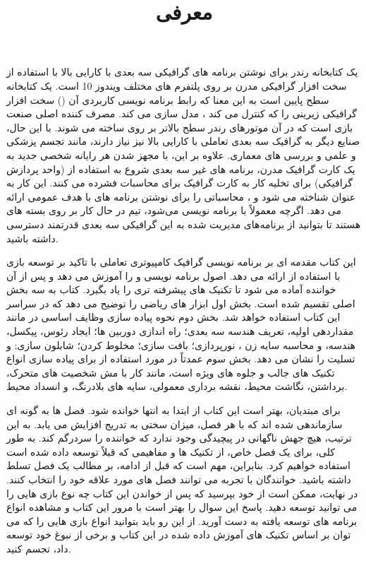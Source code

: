 \title{
    \center \Huge
    \textbf{معرفی}
    \\[25pt]
}

{\large
{} یک کتابخانه رندر برای نوشتن برنامه های گرافیکی سه بعدی با کارایی بالا با استفاده از سخت افزار گرافیکی مدرن بر روی پلتفرم های مختلف ویندوز 10  است.
 یک کتابخانه سطح پایین است به این معنا که رابط برنامه نویسی کاربردی آن () سخت افزار گرافیکی زیرینی را که کنترل می کند ، مدل سازی می کند.
مصرف کننده اصلی  صنعت بازی است که در آن موتورهای رندر سطح بالاتر بر روی  ساخته می شوند.
با این حال، صنایع دیگر به گرافیک سه بعدی تعاملی با کارایی بالا نیز نیاز دارند، مانند تجسم پزشکی و علمی و بررسی های معماری.
علاوه بر این، با مجهز شدن هر رایانه شخصی جدید به یک کارت گرافیک مدرن، برنامه های غیر سه بعدی شروع به استفاده از  (واحد پردازش گرافیکی) برای تخلیه کار به کارت گرافیک برای محاسبات فشرده می کنند.
این کار به عنوان  شناخته می شود و  ،  محاسباتی را برای نوشتن برنامه های  با هدف عمومی ارائه می دهد.
اگرچه  معمولاً با   برنامه نویسی می‌شود، تیم   در حال کار بر روی بسته های  هستند تا بتوانید از برنامه‌های مدیریت شده به این  گرافیکی سه بعدی قدرتمند دسترسی داشته باشید.
}

{\large
این کتاب مقدمه ای بر برنامه نویسی گرافیک کامپیوتری تعاملی با تاکید بر توسعه بازی با استفاده از  ارائه می دهد. اصول برنامه نویسی  و  را آموزش می دهد و پس از آن خواننده آماده می شود تا تکنیک های پیشرفته تری را یاد بگیرد.
کتاب به سه بخش اصلی تقسیم شده است. بخش اول ابزار های ریاضی را توضیح می دهد که در سراسر این کتاب استفاده خواهد شد.
بخش دوم نحوه پیاده سازی وظایف اساسی در  مانند مقداردهی اولیه، تعریف هندسه سه بعدی؛ راه اندازی دوربین ها؛ ایجاد رئوس، پیکسل، هندسه، و محاسبه سایه زن ، نورپردازی؛ بافت سازی؛ مخلوط کردن؛ شابلون سازی; و تسلیت را نشان می دهد.
بخش سوم عمدتاً در مورد استفاده از  برای پیاده سازی انواع تکنیک های جالب و جلوه های ویژه است، مانند کار با مش شخصیت های متحرک، برداشتن، نگاشت محیط، نقشه برداری معمولی، سایه های بلادرنگ، و انسداد محیط.
}

{\large
برای مبتدیان، بهتر است این کتاب از ابتدا به انتها خوانده شود. فصل ها به گونه ای سازماندهی شده اند که با هر فصل، میزان سختی به تدریج افزایش می یابد. به این ترتیب، هیچ جهش ناگهانی در پیچیدگی وجود ندارد که خواننده را سردرگم کند.
به طور کلی، برای یک فصل خاص، از تکنیک ها و مفاهیمی که قبلاً توسعه داده شده است استفاده خواهیم کرد. بنابراین، مهم است که قبل از ادامه، بر مطالب یک فصل تسلط داشته باشید.
خوانندگان با تجربه می توانند فصل های مورد علاقه خود را انتخاب کنند. در نهایت، ممکن است از خود بپرسید که پس از خواندن این کتاب چه نوع بازی هایی را می توانید توسعه دهید. پاسخ این سوال را بهتر است با مرور این کتاب و مشاهده انواع برنامه های توسعه یافته به دست آورید. از این رو باید بتوانید انواع بازی هایی را که می توان بر اساس تکنیک های آموزش داده شده در این کتاب و برخی از نبوغ خود توسعه داد، تجسم کنید.
}

